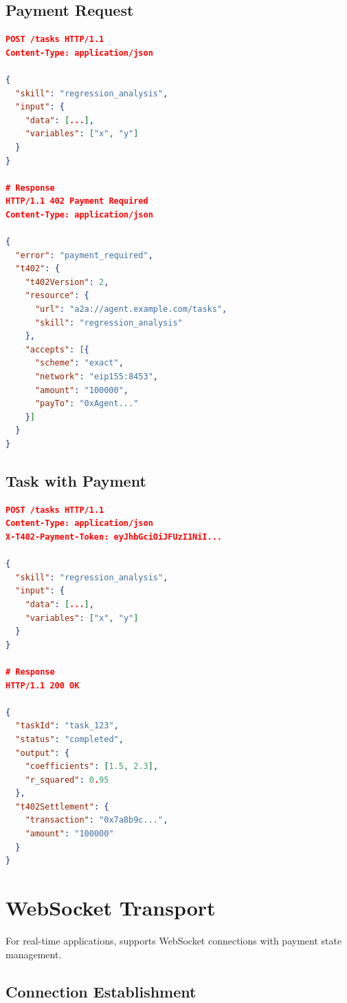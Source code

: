 \subsection{Payment Request}

\begin{lstlisting}[language=json,caption={A2A task creation requiring payment}]
POST /tasks HTTP/1.1
Content-Type: application/json

{
  "skill": "regression_analysis",
  "input": {
    "data": [...],
    "variables": ["x", "y"]
  }
}

# Response
HTTP/1.1 402 Payment Required
Content-Type: application/json

{
  "error": "payment_required",
  "t402": {
    "t402Version": 2,
    "resource": {
      "url": "a2a://agent.example.com/tasks",
      "skill": "regression_analysis"
    },
    "accepts": [{
      "scheme": "exact",
      "network": "eip155:8453",
      "amount": "100000",
      "payTo": "0xAgent..."
    }]
  }
}
\end{lstlisting}

\subsection{Task with Payment}

\begin{lstlisting}[language=json,caption={A2A task with payment token}]
POST /tasks HTTP/1.1
Content-Type: application/json
X-T402-Payment-Token: eyJhbGciOiJFUzI1NiI...

{
  "skill": "regression_analysis",
  "input": {
    "data": [...],
    "variables": ["x", "y"]
  }
}

# Response
HTTP/1.1 200 OK

{
  "taskId": "task_123",
  "status": "completed",
  "output": {
    "coefficients": [1.5, 2.3],
    "r_squared": 0.95
  },
  "t402Settlement": {
    "transaction": "0x7a8b9c...",
    "amount": "100000"
  }
}
\end{lstlisting}

\section{WebSocket Transport}
\label{sec:websocket-transport}

For real-time applications, \tprotocol{} supports WebSocket connections with payment state management.

\subsection{Connection Establishment}

